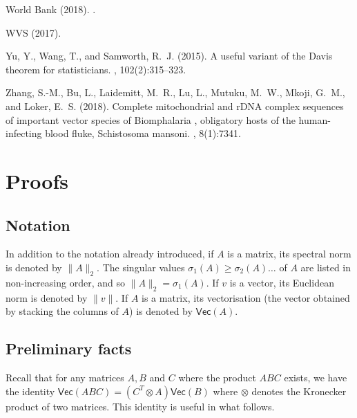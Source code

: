 \documentclass[a4]{article}
\newcommand{\+}[1]{\mathbf{#1}}
\newcommand{\norm}[1]{\|#1\|}
\newcommand{\Vect}{\mathsf{Vec}}
\begin{document}
\begin{thebibliography}{}
{World Bank} (2018).
.

WVS (2017).

Yu, Y., Wang, T., and Samworth, R.~J. (2015).
\newblock A useful variant of the {{Davis}} theorem for
  statisticians.
, 102(2):315--323.

Zhang, S.-M., Bu, L., Laidemitt, M.~R., Lu, L., Mutuku, M.~W., Mkoji, G.~M.,
  and Loker, E.~S. (2018).
\newblock Complete mitochondrial and {{rDNA}} complex sequences of important
  vector species of {{Biomphalaria}} , obligatory hosts of the human-infecting
  blood fluke, {{Schistosoma}} mansoni.
, 8(1):7341.

\end{thebibliography}
% 
\appendix

\section{Proofs}
\label{sec:appendix}


\subsection{Notation} In addition to the notation already introduced, if $A$ is a matrix, its spectral norm is denoted by $\norm{A}_{2}$. The singular values $\sigma_{1}(A) \geq \sigma_{2}(A) \dots$ of $A$ are listed in non-increasing order, and so $\norm{A}_{2} = \sigma_{1}(A)$. If $v$ is a vector, its Euclidean norm is denoted by $\norm{v}$. If $A$ is a matrix, its vectorisation (the vector obtained by stacking the columns of $A$) is denoted by $\Vect(A)$. 

\subsection{Preliminary facts} Recall that for any matrices $A, B$ and $C$ where the product $ABC$ exists, we have the identity $\Vect(ABC) = (C^{T} \otimes A)\Vect(B)$ where $\otimes$ denotes the Kronecker product of two matrices. This identity is useful in what follows.
\end{document}
